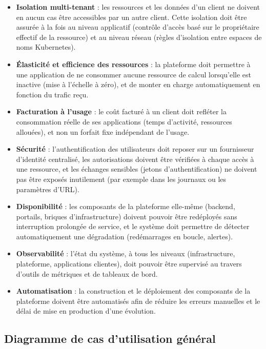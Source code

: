     \begin{itemize}
        \item \textbf{Isolation multi-tenant} : les ressources et les données d'un client ne doivent en aucun cas être accessibles par un autre client. Cette isolation doit être assurée à la fois au niveau applicatif (contrôle d'accès basé sur le propriétaire effectif de la ressource) et au niveau réseau (règles d'isolation entre espaces de noms Kubernetes).
        \item \textbf{Élasticité et efficience des ressources} : la plateforme doit permettre à une application de ne consommer aucune ressource de calcul lorsqu'elle est inactive (mise à l'échelle à zéro), et de monter en charge automatiquement en fonction du trafic reçu.
        \item \textbf{Facturation à l'usage} : le coût facturé à un client doit refléter la consommation réelle de ses applications (temps d'activité, ressources allouées), et non un forfait fixe indépendant de l'usage.
        \item \textbf{Sécurité} : l'authentification des utilisateurs doit reposer sur un fournisseur d'identité centralisé, les autorisations doivent être vérifiées à chaque accès à une ressource, et les échanges sensibles (jetons d'authentification) ne doivent pas être exposés inutilement (par exemple dans les journaux ou les paramètres d'URL).
        \item \textbf{Disponibilité} : les composants de la plateforme elle-même (backend, portails, briques d'infrastructure) doivent pouvoir être redéployés sans interruption prolongée de service, et le système doit permettre de détecter automatiquement une dégradation (redémarrages en boucle, alertes).
        \item \textbf{Observabilité} : l'état du système, à tous les niveaux (infrastructure, plateforme, applications clientes), doit pouvoir être supervisé au travers d'outils de métriques et de tableaux de bord.
        \item \textbf{Automatisation} : la construction et le déploiement des composants de la plateforme doivent être automatisés afin de réduire les erreurs manuelles et le délai de mise en production d'une évolution.
    \end{itemize}
    
    \subsection{Diagramme de cas d'utilisation général}
    
